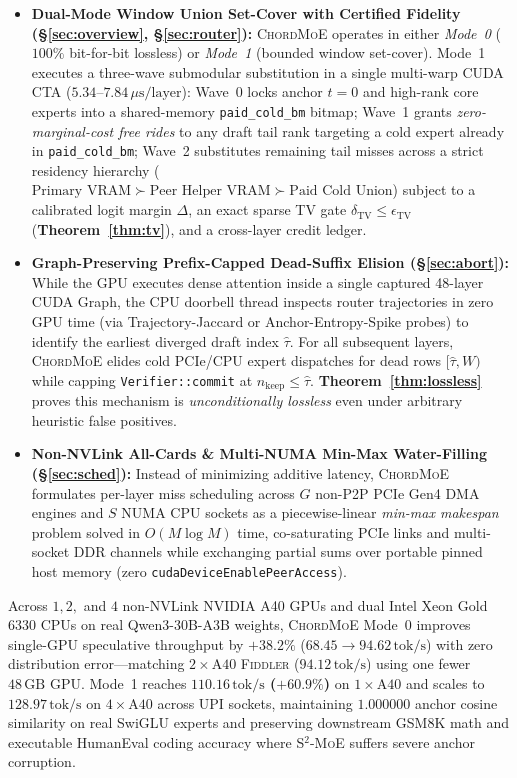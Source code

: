 \documentclass[10pt,twocolumn]{article}
\theoremstyle{definition}
\begin{document}
\begin{itemize}
  \item \textbf{Dual-Mode Window Union Set-Cover with Certified Fidelity (\S\ref{sec:overview}, \S\ref{sec:router}):} \textsc{ChordMoE} operates in either \emph{Mode~0} ($100\%$ bit-for-bit lossless) or \emph{Mode~1} (bounded window set-cover). Mode~1 executes a three-wave submodular substitution in a single multi-warp CUDA CTA ($5.34\text{--}7.84\,\mu\text{s/layer}$): Wave~0 locks anchor $t=0$ and high-rank core experts into a shared-memory \texttt{paid\_cold\_bm} bitmap; Wave~1 grants \emph{zero-marginal-cost free rides} to any draft tail rank targeting a cold expert already in \texttt{paid\_cold\_bm}; Wave~2 substitutes remaining tail misses across a strict residency hierarchy ($\text{Primary VRAM} \succ \text{Peer Helper VRAM} \succ \text{Paid Cold Union}$) subject to a calibrated logit margin $\Delta$, an exact sparse TV gate $\delta_{\mathrm{TV}} \le \epsilon_{\mathrm{TV}}$ (\textbf{Theorem~\ref{thm:tv}}), and a cross-layer credit ledger.
  \item \textbf{Graph-Preserving Prefix-Capped Dead-Suffix Elision (\S\ref{sec:abort}):} While the GPU executes dense attention inside a single captured 48-layer CUDA Graph, the CPU doorbell thread inspects router trajectories in zero GPU time (via Trajectory-Jaccard or Anchor-Entropy-Spike probes) to identify the earliest diverged draft index $\hat{\tau}$. For all subsequent layers, \textsc{ChordMoE} elides cold PCIe/CPU expert dispatches for dead rows $[\hat{\tau}, W)$ while capping \texttt{Verifier::commit} at $n_{\text{keep}} \le \hat{\tau}$. \textbf{Theorem~\ref{thm:lossless}} proves this mechanism is \emph{unconditionally lossless} even under arbitrary heuristic false positives.
  \item \textbf{Non-NVLink All-Cards \& Multi-NUMA Min-Max Water-Filling (\S\ref{sec:sched}):} Instead of minimizing additive latency, \textsc{ChordMoE} formulates per-layer miss scheduling across $G$ non-P2P PCIe Gen4 DMA engines and $S$ NUMA CPU sockets as a piecewise-linear \emph{min-max makespan} problem solved in $O(M \log M)$ time, co-saturating PCIe links and multi-socket DDR channels while exchanging partial sums over portable pinned host memory (zero \texttt{cudaDeviceEnablePeerAccess}).
\end{itemize}

Across $1, 2,$ and $4$ non-NVLink NVIDIA A40 GPUs and dual Intel Xeon Gold 6330 CPUs on real Qwen3-30B-A3B weights, \textsc{ChordMoE} Mode~0 improves single-GPU speculative throughput by \textbf{$+38.2\%$} ($68.45 \to 94.62\,\text{tok/s}$) with zero distribution error—matching $2\times\text{A40}$ \textsc{Fiddler} ($94.12\,\text{tok/s}$) using one fewer $48\,\text{GB}$ GPU. Mode~1 reaches \textbf{$110.16\,\text{tok/s}$ ($+60.9\%$)} on $1\times\text{A40}$ and scales to \textbf{$128.97\,\text{tok/s}$} on $4\times\text{A40}$ across UPI sockets, maintaining $1.000000$ anchor cosine similarity on real SwiGLU experts and preserving downstream GSM8K math and executable HumanEval coding accuracy where \textsc{S$^2$-MoE} suffers severe anchor corruption.
\end{document}
